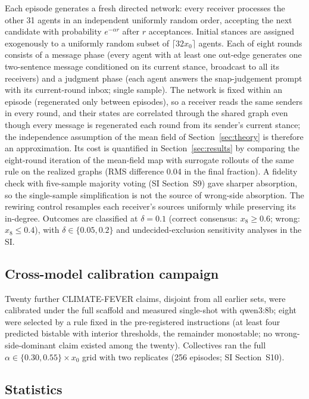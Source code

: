 \documentclass[11pt]{article}
\begin{document}
Each episode generates a fresh directed network: every receiver processes the
other 31 agents in an independent uniformly random order, accepting the next
candidate with probability $e^{-\alpha r}$ after $r$ acceptances. Initial
stances are assigned exogenously to a uniformly random subset of
$\lceil 32 x_0 \rceil$ agents. Each of eight rounds consists of a message
phase (every agent with at least one out-edge generates one two-sentence
message conditioned on its current stance, broadcast to all its receivers)
and a judgment phase (each agent answers the snap-judgement prompt with its
current-round inbox; single sample). The network is fixed within an episode
(regenerated only between episodes), so a receiver reads the same senders in
every round, and their states are correlated through the shared graph even
though every message is regenerated each round from its sender's current
stance; the independence assumption of the mean field of
Section~\ref{sec:theory} is therefore an approximation. Its cost is
quantified in Section~\ref{sec:results} by comparing the eight-round
iteration of the mean-field map with surrogate rollouts of the same rule on
the realized graphs (RMS difference 0.04 in the final fraction). A fidelity check with five-sample majority voting (SI Section~S9) gave
sharper absorption, so the single-sample simplification is not the source
of wrong-side absorption. The rewiring control resamples each receiver's sources uniformly
while preserving its in-degree. Outcomes are classified at $\delta = 0.1$
(correct consensus: $x_8 \ge 0.6$; wrong: $x_8 \le 0.4$), with
$\delta \in \{0.05, 0.2\}$ and undecided-exclusion sensitivity analyses in
the SI.

\subsection*{Cross-model calibration campaign}

Twenty further CLIMATE-FEVER claims, disjoint from all earlier sets, were
calibrated under the full scaffold and measured single-shot with qwen3:8b;
eight were selected by a rule fixed in the pre-registered instructions (at
least four predicted bistable with interior thresholds, the remainder
monostable; no wrong-side-dominant claim existed among the twenty).
Collectives ran the full $\alpha \in \{0.30, 0.55\} \times x_0$ grid with two
replicates (256 episodes; SI Section~S10).

\subsection*{Statistics}
\end{document}
